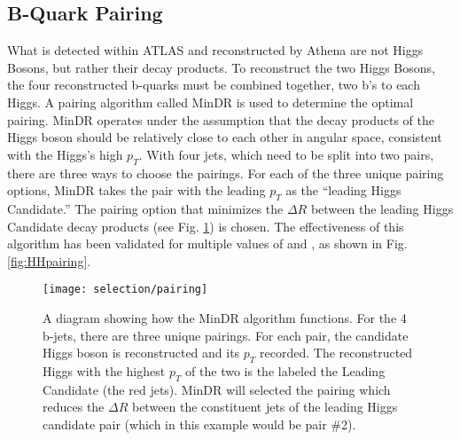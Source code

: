     \subsection{B-Quark Pairing}

        What is detected within ATLAS and reconstructed by Athena are not Higgs Bosons, but rather their decay products.
        To reconstruct the two Higgs Bosons, the four reconstructed b-quarks must be combined together, two b's to each Higgs.
        A pairing algorithm called MinDR\cite{hh4b_2021_int_note}
            is used to determine the optimal pairing.
        MinDR operates under the assumption that the decay products of the Higgs boson
            should be relatively close to each other in angular space, consistent with the Higgs's high $p_T$.
        With four jets, which need to be split into two pairs, there are three ways to choose the pairings.
        For each of the three unique pairing options, MinDR takes the pair with the leading $p_T$ as the ``leading Higgs Candidate.''
        The pairing option that minimizes the $\Delta R$ between the leading Higgs Candidate decay products
            (see Fig. \ref{fig:minDR_pairing_diagram}) is chosen.
        The effectiveness of this algorithm has been validated for multiple values of \kvv and \kl,
            as shown in Fig. \ref{fig:HHpairing}.

        \begin{figure}[tbh]
            \texttt{[image: selection/pairing]}
            \caption{
                A diagram showing how the MinDR algorithm functions.
                For the 4 b-jets, there are three unique pairings.
                For each pair, the candidate Higgs boson is reconstructed and its $p_T$ recorded.
                The reconstructed Higgs with the highest $p_T$ of the two is the labeled the Leading Candidate
                    (the red jets).
                MinDR will selected the pairing which reduces the $\Delta R$ between the constituent jets
                    of the leading Higgs candidate pair (which in this example would be pair \#2)\cite{hh4b_2021_int_note}.
            }
            \label{fig:minDR_pairing_diagram}
        \end{figure}


